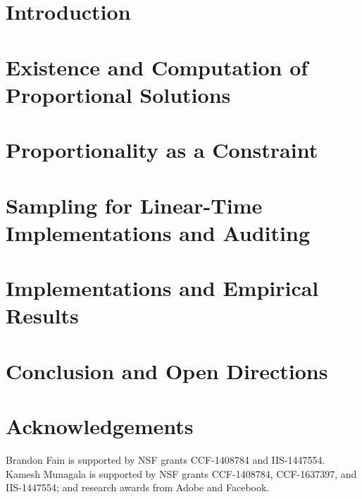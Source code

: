 \documentclass{article}
\begin{document}
\section{Introduction}
\label{sec:introduction}


\section{Existence and Computation of Proportional Solutions} 
\label{sec:theory}


\section{Proportionality as a Constraint}
\label{sec:lp}


\section{Sampling for Linear-Time Implementations and Auditing}
\label{sec:audit}


\section{Implementations and Empirical Results}
\label{sec:experiments}


\section{Conclusion and Open Directions}
\label{sec:open}


\section*{Acknowledgements}
Brandon Fain is supported by NSF grants CCF-1408784 and IIS-1447554. Kamesh Munagala is supported by NSF grants CCF-1408784, CCF-1637397, and IIS-1447554; and research awards from Adobe and Facebook.




%

\end{document}
